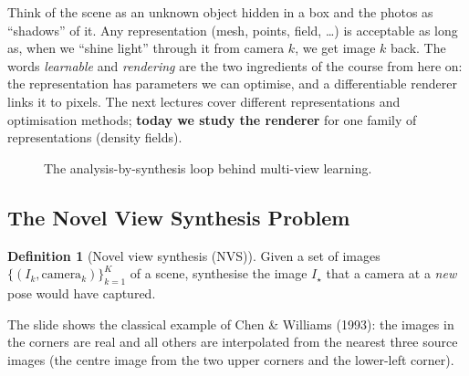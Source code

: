 \documentclass[11pt,a4paper]{article}
\theoremstyle{definition}
\newtheorem{definition}{Definition}[section]
\theoremstyle{plain}
\theoremstyle{remark}
\begin{document}
\begin{intuition}
Think of the scene as an unknown object hidden in a box and the photos as ``shadows'' of it. Any representation (mesh, points, field, \dots) is acceptable as long as, when we ``shine light'' through it from camera $k$, we get image $k$ back. The words \emph{learnable} and \emph{rendering} are the two ingredients of the course from here on: the representation has parameters we can optimise, and a differentiable renderer links it to pixels. The next lectures cover different representations and optimisation methods; \textbf{today we study the renderer} for one family of representations (density fields).
\end{intuition}

\begin{figure}[h]
\centering
{}
\caption{The analysis-by-synthesis loop behind multi-view learning.}
\end{figure}

\subsection{The Novel View Synthesis Problem}

\begin{definition}[Novel view synthesis (NVS)]\label{def:nvs}
Given a set of images $\{(I_k,\text{camera}_k)\}_{k=1}^K$ of a scene, synthesise the image $I_\star$ that a camera at a \emph{new} pose would have captured.
\end{definition}

The slide shows the classical example of Chen \& Williams (1993): the images in the corners are real and all others are interpolated from the nearest three source images (the centre image from the two upper corners and the lower-left corner).
\end{document}
